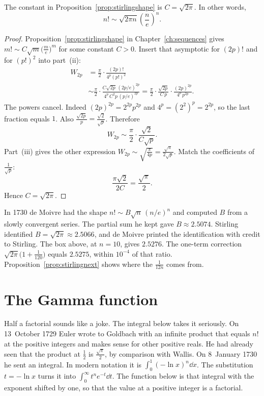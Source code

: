 \begin{theorem}\label{thm:stirlingC}\label{thm:stirling}
The constant in Proposition~\ref{prop:stirlingshape} is $C=\sqrt{2\pi}$. In other words,
\[
n!\sim\sqrt{2\pi n}\left(\frac ne\right)^n.
\]
\end{theorem}
\begin{proof}
Proposition~\ref{prop:stirlingshape} in Chapter~\ref{ch:sequences} gives $m!\sim C\sqrt m\bigl(\frac me\bigr)^m$ for some constant $C>0$. Insert that asymptotic for $(2p)!$ and for $(p!)^2$ into part~(ii):
\begin{align*}
W_{2p}
&=\frac\pi2\cdot\frac{(2p)!}{4^p(p!)^2}\\
&\sim\frac\pi2\cdot\frac{C\sqrt{2p}\,(2p/e)^{2p}}{4^p\,C^2 p\,(p/e)^{2p}}
=\frac\pi2\cdot\frac{\sqrt{2p}}{C\,p}\cdot\frac{(2p)^{2p}}{4^p\,p^{2p}}.
\end{align*}
The powers cancel. Indeed $(2p)^{2p}=2^{2p}p^{2p}$ and $4^p=(2^2)^p=2^{2p}$, so the last fraction equals $1$. Also $\frac{\sqrt{2p}}{p}=\frac{\sqrt2}{\sqrt p}$. Therefore
\[
W_{2p}\sim\frac\pi2\cdot\frac{\sqrt2}{C\sqrt p}.
\]
Part~(iii) gives the other expression $W_{2p}\sim\sqrt{\frac\pi{4p}}=\frac{\sqrt\pi}{2\sqrt p}$. Match the coefficients of $\frac1{\sqrt p}$:
\[
\frac{\pi\sqrt2}{2C}=\frac{\sqrt\pi}2.
\]
Hence $C=\sqrt{2\pi}$.
\end{proof}

In 1730 de Moivre had the shape $n!\sim B\sqrt n\,(n/e)^n$ and computed $B$ from a slowly convergent series. The partial sum he kept gave $B\approx2.5074$. Stirling identified $B=\sqrt{2\pi}\approx2.5066$, and de Moivre printed the identification with credit to Stirling. The box above, at $n=10$, gives $2.5276$. The one-term correction $\sqrt{2\pi}\bigl(1+\frac1{120}\bigr)$ equals $2.5275$, within $10^{-4}$ of that ratio. Proposition~\ref{prop:stirlingnext} shows where the $\frac1{12n}$ comes from.


\section{The Gamma function}

Half a factorial sounds like a joke. The integral below takes it seriously. On 13~October 1729 Euler wrote to Goldbach with an infinite product that equals $n!$ at the positive integers and makes sense for other positive reals. He had already seen that the product at $\frac12$ is $\frac{\sqrt\pi}2$, by comparison with Wallis. On 8~January 1730 he sent an integral. In modern notation it is $\int_0^1(-\ln x)^n\dd x$. The substitution $t=-\ln x$ turns it into $\int_0^\infty t^n e^{-t}\dd t$. The function below is that integral with the exponent shifted by one, so that the value at a positive integer is a factorial.

